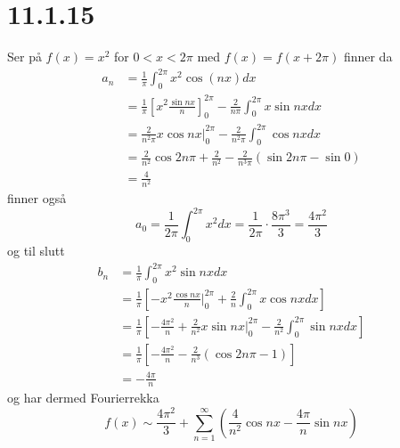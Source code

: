 \documentclass{report}
\newcommand{\nbrack}[1]{\left( #1 \right)}
\newcommand{\bbrack}[1]{\left[ #1 \right]}
\begin{document}
\section*{11.1.15}
Ser på $f(x) = x^{2}$ for $0 < x < 2\pi$ med $f(x) = f(x + 2\pi)$ finner da
\begin{equation}
  \label{eq:2}
  \begin{split}
    a_{n} &= \frac{1}{\pi} \int_{0}^{2\pi} x^{2} \cos\nbrack{nx} dx \\
          &= \frac{1}{\pi} \bbrack{ x^{2} \frac{\sin nx}{n} }_{0}^{2\pi} - \frac{2}{n\pi} \int_{0}^{2\pi} x \sin nx dx \\
          &= \frac{2}{n^{2}\pi} x\cos nx \Big| _{0}^{2\pi} - \frac{2}{n^{2}\pi} \int_{0}^{2\pi} \cos nx dx \\
          &= \frac{2}{n^{2}} \cos 2n\pi + \frac{2}{n^{2}} - \frac{2}{n^{3}\pi} \nbrack{ \sin 2n\pi  - \sin 0 } \\
    &= \frac{4}{n^{2}}
  \end{split}
\end{equation}
finner også
\begin{equation}
  \label{eq:3}
  a_{0} = \frac{1}{2\pi} \int_{0}^{2\pi} x^{2} dx = \frac{1}{2\pi} \cdot \frac{8\pi^{3}}{3} = \frac{4\pi^{2}}{3}
\end{equation}
og til slutt
\begin{equation}
  \label{eq:4}
  \begin{split}
    b_{n} &= \frac{1}{\pi} \int_{0}^{2\pi} x^{2} \sin nx dx \\
          &= \frac{1}{\pi} \bbrack{ -x^{2} \frac{\cos nx}{n} \Big| _{0}^{2\pi} + \frac{2}{n} \int_{0}^{2\pi} x \cos nx dx } \\
          &= \frac{1}{\pi} \bbrack{ -\frac{4\pi^{2}}{n} + \frac{2}{n^{2}} x\sin nx \Big|_{0}^{2\pi} - \frac{2}{n^{2}} \int_{0}^{2\pi} \sin nx dx  } \\
          &= \frac{1}{\pi} \bbrack{ -\frac{4\pi^{2}}{n} - \frac{2}{n^{3}} \nbrack{ \cos 2n\pi - 1 } } \\
    &= -\frac{4\pi}{n}
  \end{split}
\end{equation}
og har dermed Fourierrekka
\begin{equation}
  \label{eq:5}
  f(x) \sim \frac{4\pi^{2}}{3} + \sum_{n=1}^{\infty} \nbrack{ \frac{4}{n^{2}} \cos nx - \frac{4\pi}{n} \sin nx }
\end{equation}
\end{document}
